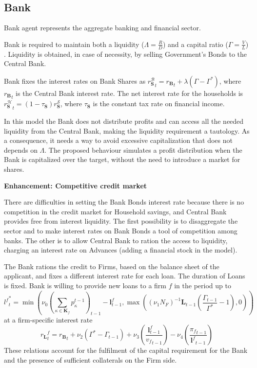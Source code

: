 \documentclass[a4paper, headings=standardclasses]{scrartcl}
\newenvironment{enh}[1][]{\begin{framed}\noindent\textbf{Enhancement: #1}\par}{\end{framed}}
\begin{document}
\subsection{Bank}
Bank agent represents the aggregate banking and financial sector.

Bank is required to maintain both a liquidity ($\Lambda = \frac{R}{D}$) and a capital ratio ($\Gamma = \frac{V}{L}$) \parencite[see][]{caiani2016}. Liquidity is obtained, in case of necessity, by selling Government's Bonds to the Central Bank.

Bank fixes the interest rates on Bank Shares as ${r_\mathbf{S}^\mathcal{B}}_t = {r_\mathbf{B}}_t + \lambda(\Gamma - \Gamma^*)$, where ${r_\mathbf{B}}_t$ is the Central Bank interest rate. The net interest rate for the households is ${r^\mathcal{H}_\mathbf{S}}_t = (1-\tau_\mathbf{S}) r^\mathcal{S}_\mathbf{S}$, where $\tau_\mathbf{S}$ is the constant tax rate on financial income.

In this model the Bank does not distribute profits and can access all the needed liquidity from the Central Bank, making the liquidity requirement a tautology. As a consequence, it needs a way to avoid excessive capitalization that does not depends on $\Lambda$. The proposed behaviour simulates a profit distribution when the Bank is capitalized over the target, without the need to introduce a market for shares.

\begin{enh}[Competitive credit market]
    There are difficulties in setting the Bank Bonds interest rate because there is no competition in the credit market for Household savings, and Central Bank provides free from interest liquidity.
    The first possibility is to disaggregate the sector and to make interest rates on Bank Bonds a tool of competition among banks.
    The other is to allow Central Bank to ration the access to liquidity, charging an interest rate on Advances (adding a financial stock in the model).
\end{enh}

The Bank rations the credit to Firms, based on the balance sheet of the applicant, and fixes a different interest rate for each loan. The duration of Loans is fixed.
Bank is willing to provide new loans to a firm $f$ in the period up to $${l^f}^*_t = \min (\nu_0 (\sum_{\kappa \in \mathbf{K}_f} p^{t-1}_\kappa)_{t-1} - \mathbf{l}^f_{t-1}, \max((\nu_1 N_F)^{-1} \mathbf{L}_{t-1} (\frac{\Gamma_{t-1}}{\Gamma^*}-1),0))$$ at a firm-specific interest rate $${r_\mathbf{L}}^f_t = {r_\mathbf{B}}_t + \nu_2 (\Gamma^* - \Gamma_{t-1}) + \nu_3 (\frac{\mathbf{l}^f_{t-1}}{{v_f}_{t-1}}) - \nu_4 (\frac{{\pi_f}_{t-1}}{{\mathbf{l}^f}_{t-1}})$$
These relations account for the fulfilment of the capital requirement for the Bank and the presence of sufficient collaterals on the Firm side.
\end{document}
